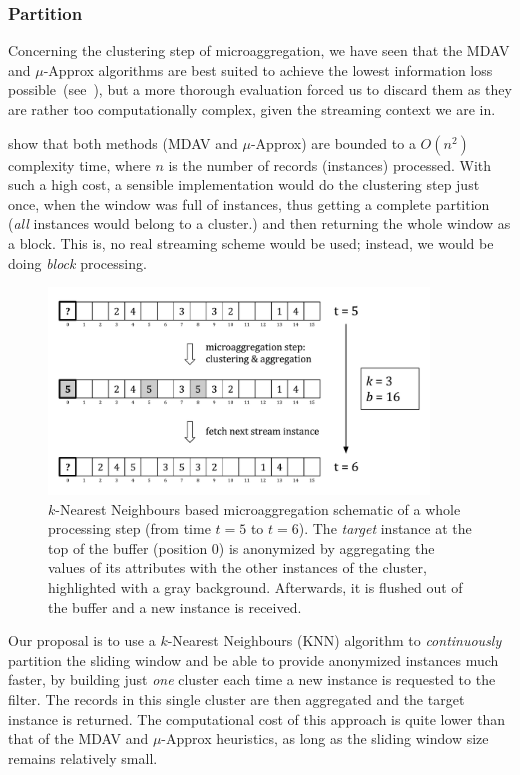 \subsubsection{Partition}

Concerning the clustering step of microaggregation, we have seen that the MDAV and $\mu$-Approx algorithms are best suited to achieve the lowest information loss possible~(see~), but a more thorough evaluation forced us to discard them as they are rather too computationally complex, given the streaming context we are in.

\citet{Domingo:MuAproxPolyTimeMicroagg} show that both methods (MDAV and $\mu$-Approx) are bounded to a $O(n^2)$ complexity time, where $n$ is the number of records (instances) processed. With such a high cost, a sensible implementation would do the clustering step just once, when the window was full of instances, thus getting a complete partition (\textit{all} instances would belong to a cluster.) and then returning the whole window as a block. This is, no real streaming scheme would be used; instead, we would be doing \textit{block} processing.

\begin{figure}[h]
	\centering
	\includegraphics[width=0.9\textwidth]{figures/microaggregation-schematic-1.pdf}
	\caption{$k$-Nearest Neighbours based microaggregation schematic of a whole processing step (from time $t=5$ to $t=6$). The \textit{target} instance at the top of the buffer (position 0) is anonymized by aggregating the values of its attributes with the other instances of the cluster, highlighted with a gray background. Afterwards, it is flushed out of the buffer and a new instance is received.}
	\label{fig:microaggregation-schematic-1}
\end{figure}

Our proposal is to use a $k$-Nearest Neighbours (KNN) algorithm to \textit{continuously} partition the sliding window and be able to provide anonymized instances much faster, by building just \textit{one} cluster each time a new instance is requested to the filter. The records in this single cluster are then aggregated and the target instance is returned. The computational cost of this approach is quite lower than that of the MDAV and $\mu$-Approx heuristics, as long as the sliding window size remains relatively small.


